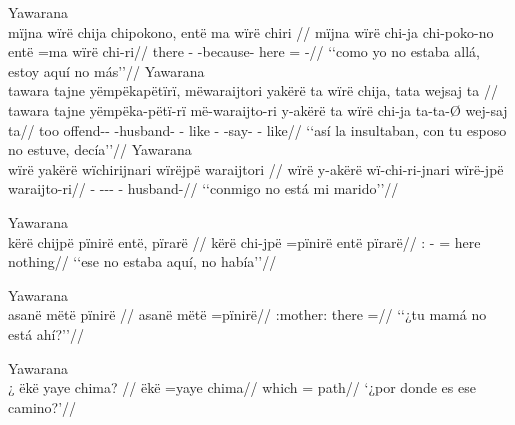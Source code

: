\documentclass{memoir}
\begin{document}
\pex\label{loc-neg-locpred-cop-neg-nsubj}    \a Yawarana\\
    \label{convamgu-99}        \begingl
        \glpreamble mïjna wïrë chija chipokono, entë ma wïrë chiri //
        \gla mïjna wïrë chi-ja chi-poko-no entë =ma wïrë chi-ri//
        \glb there  - -because- here =  -//
            \glft ‘‘como yo no estaba allá, estoy aquí no más’’//  
        \endgl 
    \a Yawarana\\
    \label{ctorosq-8}        \begingl
        \glpreamble tawara tajne yëmpëkapëtïrï, mëwaraijtori yakërë ta wïrë chija, tata wejsaj ta //
        \gla tawara tajne yëmpëka-pëtï-rï më-waraijto-ri y-akërë ta wïrë chi-ja ta-ta-Ø wej-saj ta//
        \glb too  offend-- -husband- - like  - -say- - like//
            \glft ‘‘así la insultaban, con tu esposo no estuve, decía’’//  
        \endgl 
    \a Yawarana\\
    \label{histpajirdi-81}        \begingl
        \glpreamble wïrë yakërë wïchirijnari wïrëjpë waraijtori //
        \gla wïrë y-akërë wï-chi-ri-jnari wïrë-jpë waraijto-ri//
        \glb {} - --- - husband-//
            \glft ‘‘conmigo no está mi marido’’//  
        \endgl 
\xe

\ex Yawarana \\
\label{loc-neg-nsubj-cop-pinire-part}    \begingl
    \glpreamble kërë chijpë pïnirë entë, pïrarë //
    \gla kërë chi-jpë =pïnirë entë pïrarë//
    \glb {}: - = here nothing//
        \glft ‘‘ese no estaba aquí, no había’’//  
    \endgl 
\xe

\ex Yawarana \\
\label{loc-neg-part-pinire-nsubj}    \begingl
    \glpreamble asanë mëtë pïnirë //
    \gla asanë mëtë =pïnirë//
    \glb {}:mother: there =//
        \glft ‘‘¿tu mamá no está ahí?’’//  
    \endgl 
\xe

\ex Yawarana \\
\label{loc-q-locpred-nsubj}    \begingl
    \glpreamble ¿ ëkë yaye chima? //
    \gla ëkë =yaye chima//
    \glb which = path//
        \glft ‘¿por donde es ese camino?’//  
    \endgl 
\xe
\end{document}

